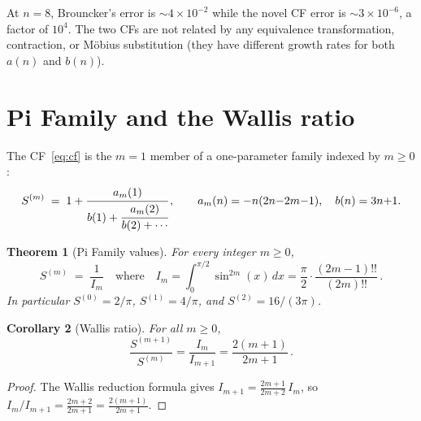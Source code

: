 \documentclass[11pt]{article}
\newcommand{\dff}[1]{(#1)!!}
\newtheorem{theorem}{Theorem}[section]
\newtheorem{corollary}[theorem]{Corollary}
\theoremstyle{remark}
\begin{document}
At $n = 8$, Brouncker's error is $\sim\!4\times 10^{-2}$ while the
novel CF error is $\sim\!3\times 10^{-6}$, a factor of $10^4$.
The two CFs are not related by any equivalence transformation,
contraction, or M\"obius substitution (they have different growth
rates for both $a(n)$ and $b(n)$).


\section{Pi Family and the Wallis ratio}\label{sec:wallis}

The CF~\eqref{eq:cf} is the $m=1$ member of a one-parameter family
indexed by $m \geq 0$:
\begin{equation}\label{eq:pifamily}
  S^{(m)} \;=\; 1 + \cfrac{a_m(1)}{b(1) + \cfrac{a_m(2)}{b(2) + \cdots}}\,,
  \qquad
  a_m(n) = -n(2n{-}2m{-}1),\quad b(n) = 3n{+}1.
\end{equation}

\begin{theorem}[Pi Family values]\label{thm:wallis}
For every integer $m \geq 0$,
\begin{equation}\label{eq:valm}
  S^{(m)} \;=\; \frac{1}{I_m}
  \quad\text{where}\quad
  I_m = \int_0^{\pi/2}\!\sin^{2m}(x)\,dx
      = \frac{\pi}{2}\cdot\frac{\dff{2m{-}1}}{(2m)!!}\,.
\end{equation}
In particular $S^{(0)} = 2/\pi$, $S^{(1)} = 4/\pi$, and
$S^{(2)} = 16/(3\pi)$.
\end{theorem}

\begin{corollary}[Wallis ratio]\label{cor:wallis}
For all $m \geq 0$,
\[
  \frac{S^{(m+1)}}{S^{(m)}}
  = \frac{I_m}{I_{m+1}}
  = \frac{2(m{+}1)}{2m{+}1}\,.
\]
\end{corollary}

\begin{proof}
The Wallis reduction formula gives
$I_{m+1} = \frac{2m{+}1}{2m{+}2}\,I_m$, so
$I_m/I_{m+1} = \frac{2m{+}2}{2m{+}1} = \frac{2(m{+}1)}{2m{+}1}$.
\end{proof}
\end{document}

